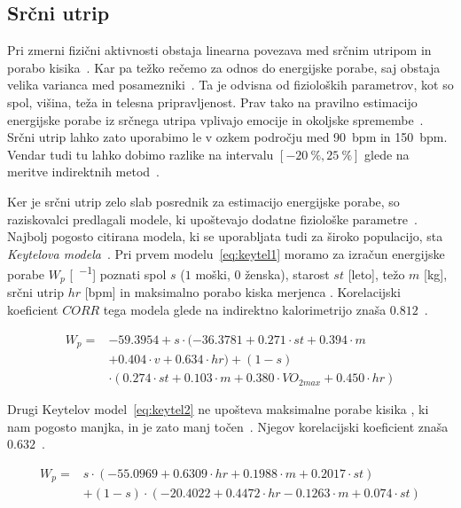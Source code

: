 \subsection{Srčni utrip}\label{sec:srcni-utrip}
Pri zmerni fizični aktivnosti obstaja linearna povezava med srčnim utripom in porabo kisika~\cite{keytel2005prediction}. Kar pa težko rečemo za odnos do energijske porabe, saj obstaja velika varianca med posamezniki~\cite{levine2005measurement}. Ta je odvisna od fizioloških parametrov, kot so spol, višina, teža in telesna pripravljenost. Prav tako na pravilno estimacijo energijske porabe iz srčnega utripa vplivajo emocije in okoljske spremembe~\cite{keytel2005prediction}. Srčni utrip lahko zato uporabimo le v ozkem področju med \SI{90}{bpm} in \SI{150}{bpm}. Vendar tudi tu lahko dobimo razlike na intervalu $[-20~\% , 25~\%]$ glede na meritve indirektnih metod~\cite{keytel2005prediction}. 

Ker je srčni utrip zelo slab posrednik za estimacijo energijske porabe, so raziskovalci predlagali modele, ki upoštevajo dodatne fiziološke parametre~\cite{charlot2014improvement}. Najbolj pogosto citirana modela, ki se uporabljata tudi za široko populacijo, sta \emph{Keytelova modela}~\cite{keytel2005prediction}. Pri prvem modelu~\eqref{eq:keytel1} moramo za izračun energijske porabe $W_p$ [\si{\kcal\per\min}] poznati spol $s$ ($1$ moški, $0$ ženska), starost $st$ [leto], težo $m$ [\si{\kg}], srčni utrip $hr$ [\si{bpm}] in maksimalno porabo kiska merjenca \vomax [\si{\ml\per\kg\per\min}]. Korelacijski koeficient $CORR$ tega modela glede na indirektno kalorimetrijo znaša $0.812$~\cite{charlot2014improvement}.

\begin{align} \label{eq:keytel1}
W_p = & -59.3954 + s \cdot (-36.3781 + 0.271 \cdot st + 0.394 \cdot m  \nonumber \\
& + 0.404 \cdot v + 0.634 \cdot hr ) + (1 - s) \nonumber \\
& \cdot (0.274 \cdot st + 0.103 \cdot m + 0.380 \cdot VO_{2max} + 0.450 \cdot hr)
\end{align}

Drugi Keytelov model~\eqref{eq:keytel2} ne upošteva maksimalne porabe kisika \vomax, ki nam pogosto manjka, in je zato manj točen~\cite{keytel2005prediction}. Njegov korelacijski koeficient \corr znaša $0.632$~\cite{charlot2014improvement}.

\begin{align}\label{eq:keytel2}
 W_p = & s \cdot (-55.0969 + 0.6309 \cdot hr + 0.1988 \cdot m + 0.2017 \cdot st) \nonumber \\
 & + (1 - s) \cdot (-20.4022 + 0.4472 \cdot hr - 0.1263 \cdot m + 0.074 \cdot st)
\end{align}

